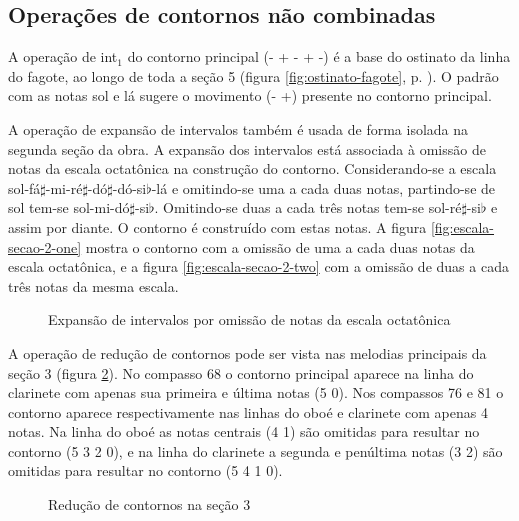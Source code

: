 \subsection{Operações de contornos não combinadas}
\label{sec:cont-nao-comb}

A operação de int$_1$ do contorno principal (- + - + -) é a base do
ostinato da linha do fagote, ao longo de toda a seção 5 (figura
\ref{fig:ostinato-fagote}, p. \pageref{fig:ostinato-fagote}). O padrão
com as notas sol e lá sugere o movimento (- +) presente no contorno
principal.

A operação de expansão de intervalos também é usada de forma isolada
na segunda seção da obra. A expansão dos intervalos está associada à
omissão de notas da escala octatônica na construção do
contorno. Considerando-se a escala
sol-fá$\sharp$-mi-ré$\sharp$-dó$\sharp$-dó-si$\flat$-lá e omitindo-se
uma a cada duas notas, partindo-se de sol tem-se
sol-mi-dó$\sharp$-si$\flat$. Omitindo-se duas a cada três notas tem-se
sol-ré$\sharp$-si$\flat$ e assim por diante. O contorno é construído
com estas notas. A figura \ref{fig:escala-secao-2-one} mostra o
contorno com a omissão de uma a cada duas notas da escala octatônica,
e a figura \ref{fig:escala-secao-2-two} com a omissão de duas a cada
três notas da mesma escala.

\begin{figure}
  \centering

  \caption{Expansão de intervalos por omissão de notas da escala
    octatônica}
  \label{fig:escala-secao-2}
\end{figure}

A operação de redução de contornos pode ser vista nas melodias
principais da seção 3 (figura \ref{fig:reducao-contornos-secao-3}). No
compasso 68 o contorno principal \contpr{} aparece na linha do
clarinete com apenas sua primeira e última notas (5 0). Nos compassos
76 e 81 o contorno aparece respectivamente nas linhas do oboé e
clarinete com apenas 4 notas. Na linha do oboé as notas centrais (4 1)
são omitidas para resultar no contorno (5 3 2 0), e na linha do
clarinete a segunda e penúltima notas (3 2) são omitidas para resultar
no contorno (5 4 1 0).

\begin{figure}
  \centering



  \caption{Redução de contornos na seção 3}
  \label{fig:reducao-contornos-secao-3}
\end{figure}


